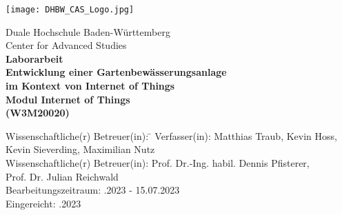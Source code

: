 \begin{titlepage}
    \begin{minipage}{\textwidth}
		\vspace{-2cm}
		\noindent \hfill \texttt{[image: DHBW\_CAS\_Logo.jpg]}
    \end{minipage}
    \vspace{1em}
    \begin{center}
        {\textsf{\large Duale Hochschule Baden-W\"urttemberg}}\\[6mm]
        {\textsf{\large Center for Advanced Studies}}\\[4em]
        {\textsf{\textbf{\large{}Laborarbeit}}}\\[6mm]
        {\textsf{\textbf{\Large{}Entwicklung einer Gartenbewässerungsanlage}}} \\[4mm]
        {\textsf{\textbf{\Large{}im Kontext von Internet of Things}}} \\[1.5cm]
        {\textsf{\textbf{\large{}Modul Internet of Things}}\\[6mm]
        \textsf{\textbf{(W3M20020)}}}\vspace{10em}
        
        \begin{minipage}{\textwidth}
            \begin{tabbing}
            Wissenschaftliche(r) Betreuer(in): \hspace{0.85cm}\=\kill
            Verfasser(in): \> Matthias Traub, Kevin Hoss, \\[1.5mm]
            \> Kevin Sieverding, Maximilian Nutz \\[1.5mm]
            Wissenschaftliche(r) Betreuer(in): \> Prof. Dr.-Ing. habil. Dennis Pfisterer, \\[1.5mm]
            \> Prof. Dr. Julian Reichwald \\[1.5mm]
            Bearbeitungszeitraum: .2023 - 15.07.2023 \\[1.5mm]
    		Eingereicht: .2023
            \end{tabbing}
        \end{minipage}
    \end{center}
\end{titlepage}